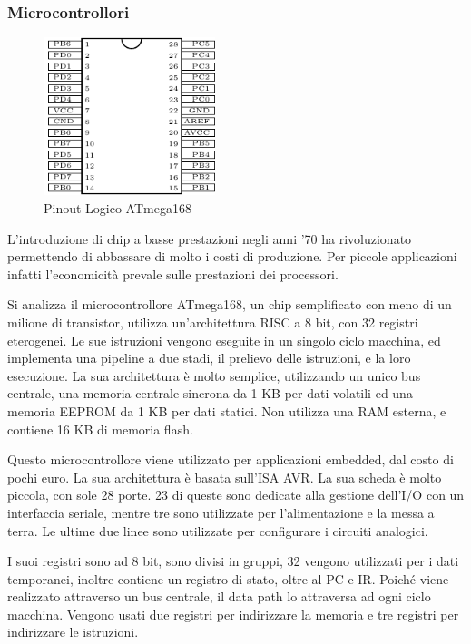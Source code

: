 \documentclass{article}
\numberwithin{equation}{subsection}
\begin{document}
\subsubsection{Microcontrollori}

\begin{figure}%
    \centering%
    \includegraphics[width=5cm]{pinout-atmega168.pdf}%
    \caption{Pinout Logico ATmega168}%
\end{figure}

L'introduzione di chip a basse prestazioni negli anni '70 ha rivoluzionato permettendo di abbassare di molto i costi di produzione. Per piccole applicazioni infatti l'economicità prevale 
sulle prestazioni dei processori. 


Si analizza il microcontrollore ATmega168, un chip semplificato con meno di un milione di transistor, utilizza un'architettura RISC a 8 bit, con 32 registri eterogenei. Le 
sue istruzioni vengono eseguite in un singolo ciclo macchina, ed implementa una pipeline a due stadi, il prelievo delle istruzioni, e la loro esecuzione. 
La sua architettura è molto semplice, utilizzando un unico bus centrale, una memoria centrale sincrona da 1 KB per dati volatili ed una memoria EEPROM da 1 KB per dati statici. 
Non utilizza una RAM esterna, e contiene 16 KB di memoria flash. 

Questo microcontrollore viene utilizzato per applicazioni embedded, dal costo di pochi euro. La sua architettura è basata sull'ISA AVR. La sua scheda è molto piccola, con sole 28 porte. 
23 di queste sono dedicate alla gestione dell'I/O con un interfaccia seriale, mentre tre sono utilizzate per l'alimentazione e la messa a terra. Le ultime due linee sono utilizzate per 
configurare i circuiti analogici. 

I suoi registri sono ad 8 bit, sono divisi in gruppi, 32 vengono utilizzati per i dati temporanei, inoltre contiene un registro di stato, oltre al PC e IR. 
Poiché viene realizzato attraverso un bus centrale, il data path lo attraversa ad ogni ciclo macchina. Vengono usati due registri per indirizzare la memoria e tre registri per indirizzare 
le istruzioni. 
\end{document}
